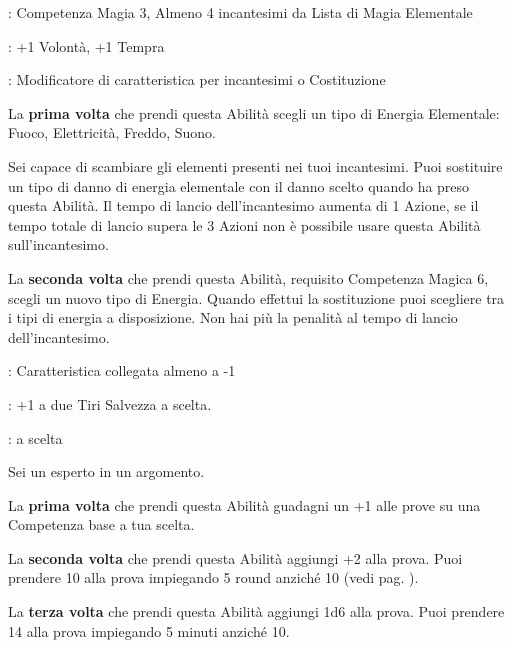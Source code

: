 \begin{multicols}{2}
\begin{description}[noitemsep, topsep=0pt, parsep=0pt, partopsep=0pt, leftmargin=0cm, labelwidth=2.5cm]
    \item[\textbf{Requisito}]: Competenza Magia 3, Almeno 4 incantesimi da Lista di Magia Elementale
    \item[\textbf{Tiri Salvezza}]: +1 Volontà, +1 Tempra
    \item[\textbf{Caratteristica}]: Modificatore di caratteristica per incantesimi o Costituzione
\end{description}

La \textbf{prima volta} che prendi questa Abilità scegli un tipo di Energia Elementale: Fuoco, Elettricità, Freddo, Suono.

Sei capace di scambiare gli elementi presenti nei tuoi incantesimi. Puoi sostituire un tipo di danno di energia elementale con il danno scelto quando ha preso questa Abilità.
Il tempo di lancio dell'incantesimo aumenta di 1 Azione, se il tempo totale di lancio supera le 3 Azioni non è possibile usare questa Abilità sull'incantesimo.

La \textbf{seconda volta} che prendi questa Abilità, requisito Competenza Magica 6, scegli un nuovo tipo di Energia. Quando effettui la sostituzione puoi scegliere tra i tipi di energia a disposizione. Non hai più la penalità al tempo di lancio dell'incantesimo.

\begin{description}[noitemsep, topsep=0pt, parsep=0pt, partopsep=0pt, leftmargin=0cm, labelwidth=2.5cm]
    \item[\textbf{Requisito}]: Caratteristica collegata almeno a -1
    \item[\textbf{Tiri Salvezza}]: +1 a due Tiri Salvezza a scelta.
    \item[\textbf{Caratteristica}]: a scelta
\end{description}

Sei un esperto in un argomento.

La \textbf{prima volta} che prendi questa Abilità guadagni un +1 alle prove su una Competenza base a tua scelta.

La \textbf{seconda volta} che prendi questa Abilità aggiungi +2 alla prova. Puoi prendere 10 alla prova impiegando 5 round anziché 10 (vedi pag. \pageref{prendere10}).

La \textbf{terza volta} che prendi questa Abilità aggiungi 1d6 alla prova. Puoi prendere 14 alla prova impiegando 5 minuti anziché 10.


\end{multicols}
